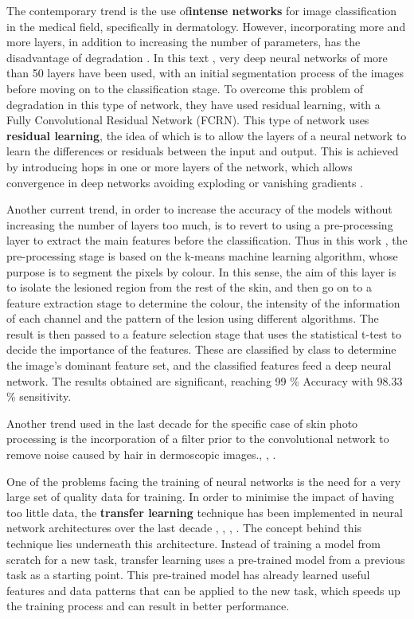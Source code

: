 The contemporary trend is the use of\textbf{intense networks} for image classification in the medical field, specifically in dermatology. However, incorporating more and more layers, in addition to increasing the number of parameters, has the disadvantage of degradation \cite{roy_effects_2023}. In this text \cite{7792699}, very deep neural networks of more than 50 layers have been used, with an initial segmentation process of the images before moving on to the classification stage. To overcome this problem of degradation in this type of network, they have used residual learning, with a Fully Convolutional 
Residual Network (FCRN). This type of network uses \textbf{residual learning}, \cite{laina_deeper_2016} the idea of which is to allow the layers of a neural network to learn the differences or residuals between the input and output. This is achieved by introducing hops in one or more layers of the network, which allows convergence in deep networks avoiding exploding or vanishing gradients \cite{wong_what_2021}.

Another current trend, in order to increase the accuracy of the models without increasing the number of layers too much,  is to revert to using a pre-processing layer to extract the main features before the classification. Thus in this work \cite{thamizhamuthu_deep_2023}, the pre-processing stage is based on the k-means machine learning algorithm, whose purpose is to segment the pixels by colour. In this sense, the aim of this layer is to isolate the lesioned region from the rest of the skin, and then go on to a feature extraction stage to determine the colour, the intensity of the information of each channel and the pattern of the lesion using different algorithms. The result is then passed to a feature selection stage that uses the statistical t-test to decide the importance of the features. These are classified by class to determine the image's dominant feature set, and the classified features feed a deep neural network. The results obtained are significant, reaching 99 \% Accuracy with 98.33 \% sensitivity. 

Another trend used in the last decade for the specific case of skin photo processing is the incorporation of a filter prior to the convolutional network to remove noise caused by hair in dermoscopic images.\cite{talavera-martinez_hair_2021}, \cite{bardou_hair_2022}, \cite{kaur_hairlines_2022}.

One of the problems facing the training of neural networks is the need for a very large set of quality data for training. In order to minimise the impact of having too little data, the \textbf{transfer learning} technique has been implemented in neural network architectures over the last decade \cite{rodrigues_new_2020}, \cite{wall_deep_2020}, \cite{abbes_deep_2021}, \cite{georgakopoulos_detection_2017}. The concept behind this technique lies underneath this architecture. Instead of training a model from scratch for a new task, transfer learning uses a pre-trained model from a previous task as a starting point. This pre-trained model has already learned useful features and data patterns that can be applied to the new task, which speeds up the training process and can result in better performance. 

